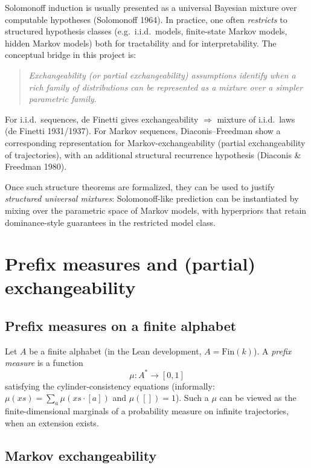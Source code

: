 \documentclass[11pt]{article}
\newcommand{\Fin}{\mathrm{Fin}}
\newcommand{\1}{\mathbf{1}}
\begin{document}
Solomonoff induction is usually presented as a universal Bayesian mixture over computable hypotheses (Solomonoff 1964).
In practice, one often \emph{restricts} to structured hypothesis classes (e.g.\ i.i.d.\ models, finite-state Markov models, hidden Markov models) both for tractability and for interpretability.
The conceptual bridge in this project is:

\begin{quote}
\emph{Exchangeability (or partial exchangeability) assumptions identify when a rich family of distributions can be represented as a mixture over a simpler parametric family.}
\end{quote}

For i.i.d.\ sequences, de Finetti gives exchangeability $\Rightarrow$ mixture of i.i.d.\ laws (de Finetti 1931/1937).
For Markov sequences, Diaconis--Freedman show a corresponding representation for Markov-exchangeability (partial exchangeability of trajectories), with an additional structural recurrence hypothesis (Diaconis \& Freedman 1980).

Once such structure theorems are formalized, they can be used to justify \emph{structured universal mixtures}:
Solomonoff-like prediction can be instantiated by mixing over the parametric space of Markov models, with hyperpriors that retain dominance-style guarantees in the restricted model class.

\section{Prefix measures and (partial) exchangeability}

\subsection{Prefix measures on a finite alphabet}

Let $A$ be a finite alphabet (in the Lean development, $A = \Fin(k)$).
A \emph{prefix measure} is a function
\[
\mu : A^\ast \to [0,1]
\]
satisfying the cylinder-consistency equations (informally: $\mu(xs)=\sum_a \mu(xs\cdot[a])$ and $\mu([])=1$).
Such a $\mu$ can be viewed as the finite-dimensional marginals of a probability measure on infinite trajectories, when an extension exists.

\subsection{Markov exchangeability}
\end{document}
